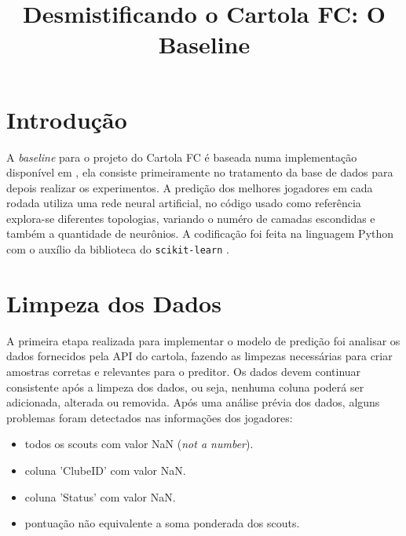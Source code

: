 \documentclass[conference]{IEEEtran}
\newcommand{\ttt}[1]{{\texttt{#1}}}
\newcommand{\tit}[1]{{\textit{#1}}}
\begin{document}
\title{Desmistificando o Cartola FC: O Baseline}

\author
{
  \and
  \and
  \and
}

\maketitle

\section{Introdução}

A  \tit{baseline}  para  o  projeto  do Cartola  FC  é  baseada  numa
implementação  disponível   em  \cite{git_cartola},   ela  consiste
primeiramente no tratamento  da base de dados para  depois realizar os
experimentos.  A  predição dos  melhores  jogadores  em cada  rodada
utiliza uma rede neural artificial,  no código usado como referência
explora-se  diferentes  topologias,  variando  o  numéro  de  camadas
escondidas  e  também a  quantidade  de  neurônios. A  codificação
foi  feita  na  linguagem  Python  com o  auxílio  da  biblioteca  do
\ttt{scikit-learn} \cite{scikit-learn}.

\section{Limpeza dos Dados}

A primeira  etapa realizada  para implementar  o modelo  de predição
foi  analisar os  dados fornecidos  pela  API do  cartola, fazendo  as
limpezas necessárias para criar amostras corretas e relevantes para o
preditor. Os  dados devem  continuar consistente  após a  limpeza dos
dados, ou  seja, nenhuma  coluna poderá  ser adicionada,  alterada ou
removida. Após uma análise prévia dos dados, alguns problemas foram
detectados nas informações dos jogadores:

\begin{itemize}
  \item todos os scouts com valor NaN (\tit{not a number}).
  \item coluna 'ClubeID' com valor NaN.
  \item coluna 'Status' com valor NaN.
  \item pontuação não equivalente a soma ponderada dos scouts.
\end{itemize}
\end{document}
